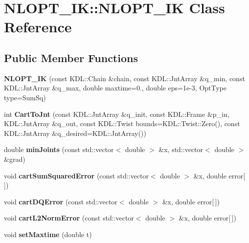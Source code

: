 \section{N\-L\-O\-P\-T\-\_\-\-I\-K\-:\-:N\-L\-O\-P\-T\-\_\-\-I\-K Class Reference}
\label{class_n_l_o_p_t___i_k_1_1_n_l_o_p_t___i_k}
\subsection*{Public Member Functions}
\begin{DoxyCompactItemize}
\item 
{\bfseries N\-L\-O\-P\-T\-\_\-\-I\-K} (const K\-D\-L\-::\-Chain \&chain, const K\-D\-L\-::\-Jnt\-Array \&q\-\_\-min, const K\-D\-L\-::\-Jnt\-Array \&q\-\_\-max, double maxtime=0., double eps=1e-\/3, Opt\-Type type=\-Sum\-Sq)\label{class_n_l_o_p_t___i_k_1_1_n_l_o_p_t___i_k_ac085096093f877e3aa6e48a051c901b4}

\item 
int {\bfseries Cart\-To\-Jnt} (const K\-D\-L\-::\-Jnt\-Array \&q\-\_\-init, const K\-D\-L\-::\-Frame \&p\-\_\-in, K\-D\-L\-::\-Jnt\-Array \&q\-\_\-out, const K\-D\-L\-::\-Twist bounds=K\-D\-L\-::\-Twist\-::\-Zero(), const K\-D\-L\-::\-Jnt\-Array \&q\-\_\-desired=K\-D\-L\-::\-Jnt\-Array())\label{class_n_l_o_p_t___i_k_1_1_n_l_o_p_t___i_k_a2179617f946254ab5005567b80a01296}

\item 
double {\bfseries min\-Joints} (const std\-::vector$<$ double $>$ \&x, std\-::vector$<$ double $>$ \&grad)\label{class_n_l_o_p_t___i_k_1_1_n_l_o_p_t___i_k_a1c691fe035e434982d7572e7a63b5bde}

\item 
void {\bfseries cart\-Sum\-Squared\-Error} (const std\-::vector$<$ double $>$ \&x, double error[$\,$])\label{class_n_l_o_p_t___i_k_1_1_n_l_o_p_t___i_k_a2fe48c6b6658b80a4b4d0af5c60e975e}

\item 
void {\bfseries cart\-D\-Q\-Error} (const std\-::vector$<$ double $>$ \&x, double error[$\,$])\label{class_n_l_o_p_t___i_k_1_1_n_l_o_p_t___i_k_aa5fae7e22eceef1a2334f152d796c6ab}

\item 
void {\bfseries cart\-L2\-Norm\-Error} (const std\-::vector$<$ double $>$ \&x, double error[$\,$])\label{class_n_l_o_p_t___i_k_1_1_n_l_o_p_t___i_k_a73b6b8160ebbd9edaaf62af7eda1aced}

\item 
void {\bfseries set\-Maxtime} (double t)\label{class_n_l_o_p_t___i_k_1_1_n_l_o_p_t___i_k_a7937363d4d3a0215725cb75915ffcdaf}

\end{DoxyCompactItemize}
